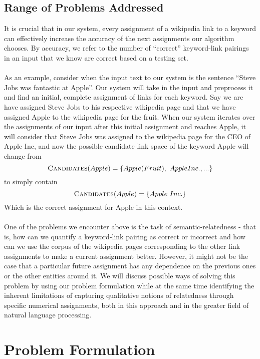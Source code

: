 \documentclass[twoside,11pt]{article}
\begin{document}
\subsection{Range of Problems Addressed}

It is crucial that in our system, every assignment of a wikipedia link to a keyword can effectively increase the accuracy of the next assignments our algorithm chooses. By accuracy, we refer to the number of ``correct'' keyword-link pairings in an input that we know are correct based on a testing set.
\\ \\
As an example, consider when the input text to our system is the sentence ``Steve Jobs was fantastic at Apple''. Our system will take in the input and preprocess it and find an initial, complete assignment of links for each keyword. Say we are have assigned Steve Jobs to his respective wikipedia page and that we have assigned Apple to the wikipedia page for the fruit. When our system iterates over the assignments of our input after this initial assignment and reaches Apple, it will consider that Steve Jobs was assigned to the wikipedia page for the CEO of Apple Inc, and now the possible candidate link space of the keyword Apple will change from
$$\mbox{{\sc Candidates}}(Apple) = \{Apple (Fruit), \ Apple Inc., ...\}$$
to simply contain
$$\mbox{{\sc Candidates}}(Apple) = \{Apple \ Inc.\}$$
Which is the correct assignment for Apple in this context.
\\ \\
One of the problems we encounter above is the task of semantic-relatedness - that is, how can we quantify a keyword-link pairing as correct or incorrect and how can we use the corpus of the wikipedia pages corresponding to the other link assignments to make a current assignment better. However, it might not be the case that a particular future assignment has any dependence on the previous ones or the other entities around it. We will discuss possible ways of solving this problem by using our problem formulation while at the same time identifying the inherent limitations of capturing qualitative notions of relatedness through specific numerical assignments, both in this approach and in the greater field of natural language processing.

\section{Problem Formulation}
\end{document}
